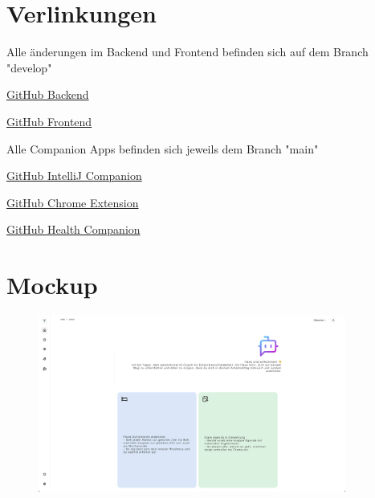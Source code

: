 \documentclass[12pt,a4paper]{report}
\begin{document}
\begin{appendices}
\renewcommand{\thesection}{\Alph{section}}

    \section{Verlinkungen}

        Alle änderungen im Backend und Frontend befinden sich auf dem Branch "develop"

        \textcolor{teal}{\href{https://github.com/fhnw-yappi/dear-dev-backend}{GitHub Backend} \\}

        \textcolor{teal}{\href{https://github.com/fhnw-yappi/dear-dev-frontend}{GitHub Frontend} \\}

        Alle Companion Apps befinden sich jeweils dem Branch "main"

        \textcolor{teal}{\href{https://github.com/fhnw-yappi/yappi-intellij-companion}{GitHub IntelliJ Companion} \\}

        \textcolor{teal}{\href{https://github.com/fhnw-yappi/yappi-chrome-extension}{GitHub Chrome Extension} \\}

        \textcolor{teal}{\href{https://github.com/fhnw-yappi/yappi-health-companion}{GitHub Health Companion} \\}

    \section{Mockup}

      \begin{figure}[H]
        \centering
        \includegraphics[width=0.90\textwidth]{../figures/mockup/IP5_Yappi_Companion_Coach.pdf}
      \end{figure}


\end{appendices}
\end{document}
